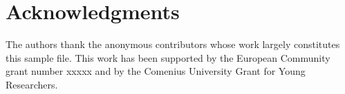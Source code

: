 \documentclass{svk_en}
\begin{document}
\section*{Acknowledgments}
The authors thank the anonymous contributors whose work largely
constitutes this sample file. This work has been supported by the 
European Community grant number xxxxx and by the Comenius University
Grant for Young Researchers.

\nocite{*}



\end{document}
